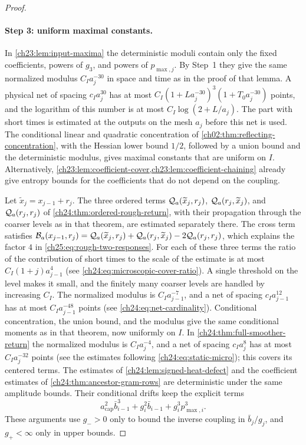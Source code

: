 \begin{proof}
\paragraph{Step 3: uniform maximal constants.}
In \cref{ch23:lem:input-maxima} the deterministic moduli contain only the fixed coefficients, powers of $g_3$, and powers of $p_{\max,j}$. By Step~1 they give the same normalized modulus $C_Ia_j^{-30}$ in space and time as in the proof of that lemma. A physical net of spacing $c_Ia_j^{30}$ has at most $C_I(1+La_j^{-30})^3(1+T_0a_j^{-30})$ points, and the logarithm of this number is at most $C_I\log(2+L/a_j)$. The part with short times is estimated at the outputs on the mesh $a_j$ before this net is used. The conditional linear and quadratic concentration of \cref{ch02:thm:reflecting-concentration}, with the Hessian lower bound $1/2$, followed by a union bound and the deterministic modulus, gives maximal constants that are uniform on $I$. Alternatively, \cref{ch23:lem:coefficient-cover,ch23:lem:coefficient-chaining} already give entropy bounds for the coefficients that do not depend on the coupling.

Let $\widetilde x_j=x_{j-1}+r_j$. The three ordered terms $\mathcal Q_{a}(\widetilde x_j,r_j)$, $\mathcal Q_{a}(r_j,\widetilde x_j)$, and $\mathcal Q_{a}(r_j,r_j)$ of \cref{ch24:thm:ordered-rough-return}, with their propagation through the coarser levels as in that theorem, are estimated separately there. The cross term satisfies $\mathcal B_{a}(x_{j-1},r_j)=\mathcal Q_{a}(\widetilde x_j,r_j)+\mathcal Q_{a}(r_j,\widetilde x_j)-2\mathcal Q_{a}(r_j,r_j)$, which explains the factor $4$ in \eqref{ch25:eq:rough-two-responses}. For each of these three terms the ratio of the contribution of short times to the scale of the estimate is at most $C_I(1+j)a_{j-1}^4$ (see \eqref{ch24:eq:microscopic-cover-ratio}). A single threshold on the level makes it small, and the finitely many coarser levels are handled by increasing $C_I$. The normalized modulus is $C_Ia_{j-1}^{-7}$, and a net of spacing $c_Ia_{j-1}^{12}$ has at most $C_Ia_{j-1}^{-48}$ points (see \eqref{ch24:eq:net-cardinality}). Conditional concentration, the union bound, and the modulus give the same conditional moments as in that theorem, now uniformly on $I$. In \cref{ch24:thm:full-smoother-return} the normalized modulus is $C_Ia_j^{-4}$, and a net of spacing $c_Ia_j^8$ has at most $C_Ia_j^{-32}$ points (see the estimates following \eqref{ch24:eq:static-micro}); this covers its centered terms. The estimates of \cref{ch24:lem:signed-heat-defect} and the coefficient estimates of \cref{ch24:thm:ancestor-gram-rows} are deterministic under the same amplitude bounds. Their conditional drifts keep the explicit terms
\[
 a_{\mathrm{cap}}^2\bar b_{i-1}^3+g_i^2\bar b_{i-1}+g_i^3p_{\max,i}^3.
\]
These arguments use $g_->0$ only to bound the inverse coupling in $\bar b_j/g_j$, and $g_+<\infty$ only in upper bounds.


\end{proof}
